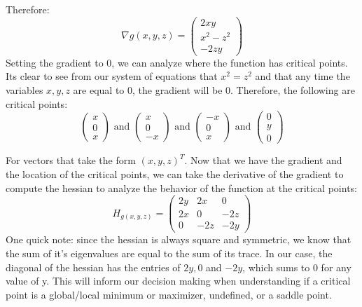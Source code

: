 \documentclass[12pt,twoside]{article}
\begin{document}
Therefore:
$$
    \nabla g(x,y,z) = 
    \begin{pmatrix}
    2xy    \\
    x^2-z^2    \\
    -2zy    
    \end{pmatrix}
$$
Setting the gradient to 0, we can analyze where the function has critical points. Its clear to see from our system of equations that $x^2 = z^2$ and that any time the variables $x,y,z$ are equal to 0, the gradient will be 0. Therefore, the following are critical points:
$$
    \begin{pmatrix}
    x \\
    0 \\ 
    x
    \end{pmatrix} \text{ and }
    \begin{pmatrix}
    x \\
    0 \\ 
    -x
    \end{pmatrix} \text{ and }
    \begin{pmatrix}
    -x \\
    0 \\ 
    x
    \end{pmatrix} \text{ and }
    \begin{pmatrix}
    0 \\
    y \\ 
    0
    \end{pmatrix}
$$

For vectors that take the form $(x,y,z)^T$. Now that we have the gradient and the location of the critical points, we can take the derivative of the gradient to compute the hessian to analyze the behavior of the function at the critical points:
$$
    H_{g(x,y,z)} = \begin{pmatrix}
    2y & 2x & 0 \\
    2x & 0 & -2z \\
    0 & -2z & -2y
    \end{pmatrix}
$$
One quick note: since the hessian is always square and symmetric, we know that the sum of it's eigenvalues are equal to the sum of its trace. In our case, the diagonal of the hessian has the entries of $2y, 0$ and $-2y$, which sums to 0 for any value of y. This will inform our decision making when understanding if a critical point is a global/local minimum or maximizer, undefined, or a saddle point. \\
\end{document}
